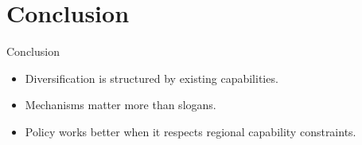\documentclass[10pt,aspectratio=169]{beamer}
\begin{document}
\section{Conclusion}

\begin{frame}{Conclusion}
\begin{itemize}
  \item Diversification is structured by existing capabilities.
  \item Mechanisms matter more than slogans.
  \item Policy works better when it respects regional capability constraints.
\end{itemize}
\end{frame}
\end{document}
